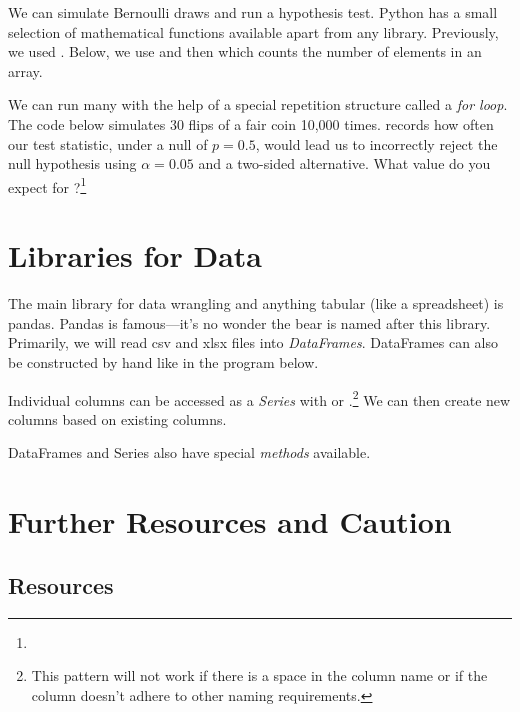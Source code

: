 \documentclass{article}
\begin{document}
We can simulate Bernoulli draws and run a hypothesis test. Python has a small selection of mathematical functions available apart from any library. Previously, we used . Below, we use  and then  which counts the number of elements in  an array.


\noindent We can run many with the help of a special repetition structure called a \emph{for loop}. The code below simulates 30 flips of a fair coin 10,000 times.  records how often our test statistic, under a null of $p= 0.5$, would lead us to incorrectly reject the null hypothesis using $\alpha = 0.05$ and a two-sided alternative. What value do you expect for ?\footnote{}




\section{Libraries for Data}

The main library for data wrangling and anything tabular (like a spreadsheet) is pandas. Pandas is famous---it's no wonder the bear is named after this library. Primarily, we will read csv and xlsx files into \emph{DataFrames}. DataFrames can also be constructed by hand like in the program below.


Individual columns can be accessed as a \emph{Series} with  or .\footnote{This pattern will not work if there is a space in the column name or if the column doesn't adhere to other naming requirements.} We can then create new columns based on existing columns. 


\noindent DataFrames and Series also have special \emph{methods} available. 


\section{Further Resources and Caution}

\subsection{Resources}
\end{document}
